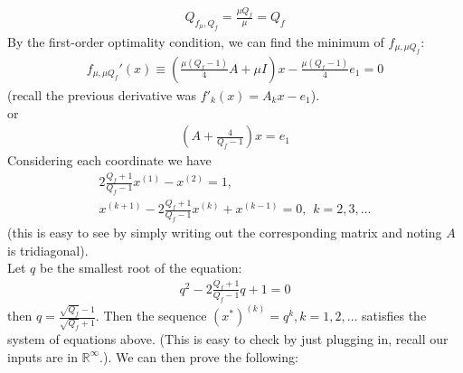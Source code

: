 \documentclass[12pt,a4paper]{article}
\begin{document}
	 \begin{align*}
	 	Q_{f_\mu,Q_f} = \frac{\mu Q_f}{\mu} = Q_f
	 \end{align*}
	 By the first-order optimality condition, we can find the minimum of $f_{\mu,\mu Q_f}$:
	 \begin{align*}
	 	f_{\mu, \mu Q_f}'(x) \equiv (\frac{\mu(Q_f - 1)}{4}A + \mu I)x - \frac{\mu(Q_f - 1)}{4}e_1 = 0
	 \end{align*}
	 (recall the previous derivative was $f'_k(x) = A_kx - e_1$).\\
	 or
	 \begin{align*}
	 	(A + \frac{4}{Q_f - 1})x = e_1
	 \end{align*}
	 Considering each coordinate we have
	 \begin{align*}
	 	2 \frac{Q_f + 1}{Q_f - 1}x^{(1)} - x^{(2)} = 1, \\
	 	x^{(k+1)} - 2 \frac{Q_f + 1}{Q_f - 1}x^{(k)} + x^{(k-1)} = 0, \hspace{5pt} k=2, 3, \ldots
	 \end{align*}
	 (this is easy to see by simply writing out the corresponding matrix and noting $A$ is tridiagonal).\\
	 Let $q$ be the smallest root of the equation:
	 \begin{align*}
	 	q^2 - 2 \frac{Q_f + 1}{Q_f - 1}q + 1 = 0
	 \end{align*}
	 then $q = \frac{\sqrt{Q_f} - 1}{\sqrt{Q_f} + 1}$. Then the sequence $(x^*)^{(k)} = q^k, k = 1, 2, \ldots$ satisfies the system of equations above. (This is easy to check by just plugging in, recall our inputs are in $\mathbb{R}^{\infty}$.). We can then prove the following:
\end{document}
